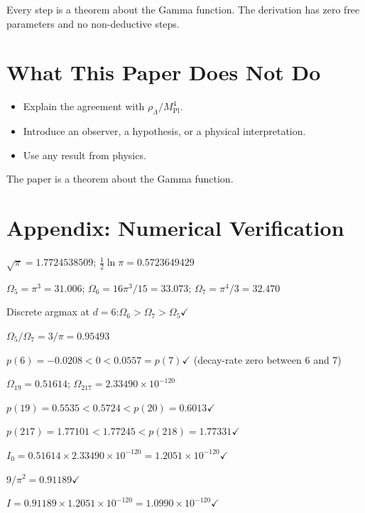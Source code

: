 \documentclass[11pt,a4paper]{article}
\begin{document}
Every step is a theorem about the Gamma function. The derivation has zero
free parameters and no non-deductive steps.

\section{What This Paper Does Not Do}

\begin{itemize}
\item Explain the agreement with
$\rho_\Lambda/M^4_{\mathrm{Pl}}$.
\item Introduce an observer, a hypothesis, or a physical interpretation.
\item Use any result from physics.
\end{itemize}

The paper is a theorem about the Gamma function.

\section*{Appendix: Numerical Verification}

$\sqrt{\pi} = 1.7724538509$\;;\quad
$\tfrac{1}{2}\ln\pi = 0.5723649429$

$\Omega_5 = \pi^3 = 31.006$\;;\quad
$\Omega_6 = 16\pi^3/15 = 33.073$\;;\quad
$\Omega_7 = \pi^4/3 = 32.470$

Discrete argmax at $d = 6$:\;$\Omega_6 > \Omega_7 > \Omega_5$\;$\checkmark$

$\Omega_5/\Omega_7 = 3/\pi = 0.95493$

$p(6) = -0.0208 < 0 < 0.0557 = p(7)$\;$\checkmark$\quad
(decay-rate zero between 6 and 7)

$\Omega_{19} = 0.51614$\;;\quad
$\Omega_{217} = 2.33490\times 10^{-120}$

$p(19) = 0.5535 < 0.5724 < p(20) = 0.6013$\;$\checkmark$

$p(217) = 1.77101 < 1.77245 < p(218) = 1.77331$\;$\checkmark$

$I_0 = 0.51614\times 2.33490\times 10^{-120}
= 1.2051\times 10^{-120}$\;$\checkmark$

$9/\pi^2 = 0.91189$\;$\checkmark$

$I = 0.91189\times 1.2051\times 10^{-120}
= 1.0990\times 10^{-120}$\;$\checkmark$
\end{document}
